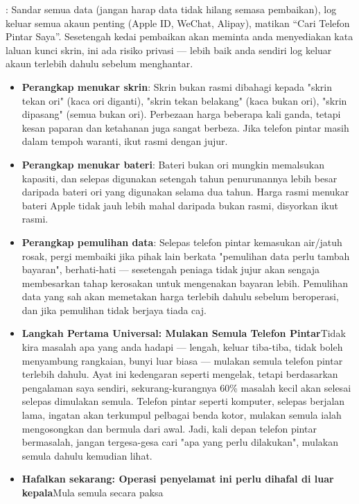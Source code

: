 
: Sandar semua data (jangan harap data tidak hilang semasa pembaikan), log keluar semua akaun penting (Apple ID, WeChat, Alipay), matikan “Cari Telefon Pintar Saya”. Sesetengah kedai pembaikan akan meminta anda menyediakan kata laluan kunci skrin, ini ada risiko privasi — lebih baik anda sendiri log keluar akaun terlebih dahulu sebelum menghantar.

\begin{itemize}
  \item \textbf{Perangkap menukar skrin}: Skrin bukan rasmi dibahagi kepada "skrin tekan ori" (kaca ori diganti), "skrin tekan belakang" (kaca bukan ori), "skrin dipasang" (semua bukan ori). Perbezaan harga beberapa kali ganda, tetapi kesan paparan dan ketahanan juga sangat berbeza. Jika telefon pintar masih dalam tempoh waranti, ikut rasmi dengan jujur.
  \item \textbf{Perangkap menukar bateri}: Bateri bukan ori mungkin memalsukan kapasiti, dan selepas digunakan setengah tahun penurunannya lebih besar daripada bateri ori yang digunakan selama dua tahun. Harga rasmi menukar bateri Apple tidak jauh lebih mahal daripada bukan rasmi, disyorkan ikut rasmi.
  \item \textbf{Perangkap pemulihan data}: Selepas telefon pintar kemasukan air/jatuh rosak, pergi membaiki jika pihak lain berkata "pemulihan data perlu tambah bayaran", berhati-hati — sesetengah peniaga tidak jujur akan sengaja membesarkan tahap kerosakan untuk mengenakan bayaran lebih. Pemulihan data yang sah akan memetakan harga terlebih dahulu sebelum beroperasi, dan jika pemulihan tidak berjaya tiada caj.
  \item \textbf{Langkah Pertama Universal: Mulakan Semula Telefon Pintar}Tidak kira masalah apa yang anda hadapi — lengah, keluar tiba-tiba, tidak boleh menyambung rangkaian, bunyi luar biasa — mulakan semula telefon pintar terlebih dahulu. Ayat ini kedengaran seperti mengelak, tetapi berdasarkan pengalaman saya sendiri, sekurang-kurangnya 60\% masalah kecil akan selesai selepas dimulakan semula. Telefon pintar seperti komputer, selepas berjalan lama, ingatan akan terkumpul pelbagai benda kotor, mulakan semula ialah mengosongkan dan bermula dari awal. Jadi, kali depan telefon pintar bermasalah, jangan tergesa-gesa cari "apa yang perlu dilakukan", mulakan semula dahulu kemudian lihat.
  \item \textbf{Hafalkan sekarang: Operasi penyelamat ini perlu dihafal di luar kepala}Mula semula secara paksa
\end{itemize}

